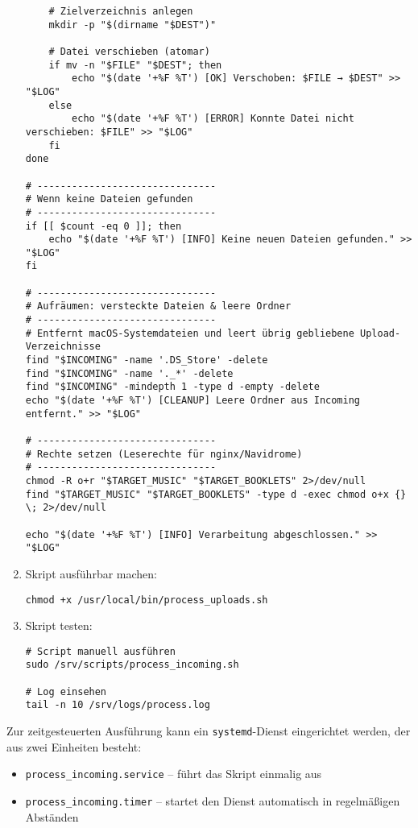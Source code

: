 \documentclass[12pt,a4paper]{report}
\begin{document}
\begin{enumerate}
\begin{verbatim}
    # Zielverzeichnis anlegen
    mkdir -p "$(dirname "$DEST")"

    # Datei verschieben (atomar)
    if mv -n "$FILE" "$DEST"; then
        echo "$(date '+%F %T') [OK] Verschoben: $FILE → $DEST" >> "$LOG"
    else
        echo "$(date '+%F %T') [ERROR] Konnte Datei nicht verschieben: $FILE" >> "$LOG"
    fi
done

# -------------------------------
# Wenn keine Dateien gefunden
# -------------------------------
if [[ $count -eq 0 ]]; then
    echo "$(date '+%F %T') [INFO] Keine neuen Dateien gefunden." >> "$LOG"
fi

# -------------------------------
# Aufräumen: versteckte Dateien & leere Ordner
# -------------------------------
# Entfernt macOS-Systemdateien und leert übrig gebliebene Upload-Verzeichnisse
find "$INCOMING" -name '.DS_Store' -delete
find "$INCOMING" -name '._*' -delete
find "$INCOMING" -mindepth 1 -type d -empty -delete
echo "$(date '+%F %T') [CLEANUP] Leere Ordner aus Incoming entfernt." >> "$LOG"

# -------------------------------
# Rechte setzen (Leserechte für nginx/Navidrome)
# -------------------------------
chmod -R o+r "$TARGET_MUSIC" "$TARGET_BOOKLETS" 2>/dev/null
find "$TARGET_MUSIC" "$TARGET_BOOKLETS" -type d -exec chmod o+x {} \; 2>/dev/null

echo "$(date '+%F %T') [INFO] Verarbeitung abgeschlossen." >> "$LOG"
    \end{verbatim}

    \item Skript ausführbar machen:
    \begin{verbatim}
chmod +x /usr/local/bin/process_uploads.sh
    \end{verbatim}

    \item Skript testen:
    \begin{verbatim}
# Script manuell ausführen
sudo /srv/scripts/process_incoming.sh

# Log einsehen
tail -n 10 /srv/logs/process.log
    \end{verbatim}
  \end{enumerate}

  Zur zeitgesteuerten Ausführung kann ein \texttt{systemd}-Dienst eingerichtet werden, 
  der aus zwei Einheiten besteht:
  \begin{itemize}
    \item \texttt{process\_incoming.service} – führt das Skript einmalig aus
    \item \texttt{process\_incoming.timer} – startet den Dienst automatisch in regelmäßigen Abständen
  \end{itemize}
\end{document}
